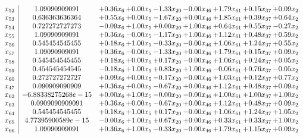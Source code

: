 \documentclass[8pt]{article}
\begin{document}
\[\begin{array}{c| c c@{\hskip 2pt} c@{\hskip 2pt} c@{\hskip 2pt} c@{\hskip 2pt} c@{\hskip 2pt} c@{\hskip 2pt} c@{\hskip 2pt} }
 x_{52}   &  1.09090909091 & +  0.36 x_{6} & +  0.00 x_{5} & -1.33 x_{20} & -0.00 x_{46} & +  1.79 x_{61} & +  0.15 x_{37} & +  0.09 x_{2}\\
 x_{53}   &  0.636363636364 & +  0.55 x_{6} & +  0.00 x_{5} & -1.67 x_{20} & +  0.00 x_{46} & +  1.85 x_{61} & +  0.39 x_{37} & +  0.64 x_{2}\\
 x_{54}   &  0.727272727273 & -0.09 x_{6} & +  1.00 x_{5} & +  0.00 x_{20} & +  1.00 x_{46} & +  0.64 x_{61} & +  0.55 x_{37} & -0.27 x_{2}\\
 x_{55}   &  1.09090909091 & +  0.36 x_{6} & -0.00 x_{5} & -1.17 x_{20} & +  1.00 x_{46} & +  1.12 x_{61} & +  0.48 x_{37} & +  0.59 x_{2}\\
 x_{56}   &  0.545454545455 & +  0.18 x_{6} & +  1.00 x_{5} & -0.33 x_{20} & -0.00 x_{46} & +  1.06 x_{61} & +  1.24 x_{37} & +  0.55 x_{2}\\
 x_{57}   &  1.09090909091 & +  0.36 x_{6} & -0.00 x_{5} & -1.33 x_{20} & +  0.00 x_{46} & +  1.79 x_{61} & +  0.15 x_{37} & +  0.09 x_{2}\\
 x_{58}   &  0.545454545455 & +  0.18 x_{6} & +  0.00 x_{5} & +  0.17 x_{20} & -0.00 x_{46} & +  1.06 x_{61} & +  0.24 x_{37} & +  0.05 x_{2}\\
 x_{59}   &  0.454545454545 & -0.18 x_{6} & +  1.00 x_{5} & +  0.83 x_{20} & +  1.00 x_{46} & -0.06 x_{61} & +  0.76 x_{37} & -0.05 x_{2}\\
 x_{60}   &  0.272727272727 & +  0.09 x_{6} & +  0.00 x_{5} & -0.17 x_{20} & -0.00 x_{46} & +  1.03 x_{61} & +  0.12 x_{37} & +  0.77 x_{2}\\
 x_{47}   &  0.090909090909 & +  0.36 x_{6} & +  0.00 x_{5} & -0.67 x_{20} & +  0.00 x_{46} & +  1.12 x_{61} & +  0.48 x_{37} & +  0.09 x_{2}\\
 x_{62}   &  -6.88338275268e-15 & +  0.00 x_{6} & +  1.00 x_{5} & -0.00 x_{20} & -0.00 x_{46} & +  1.00 x_{61} & +  1.00 x_{37} & +  1.00 x_{2}\\
 x_{63}   &  0.0909090909091 & +  0.36 x_{6} & +  0.00 x_{5} & -0.67 x_{20} & +  0.00 x_{46} & +  1.12 x_{61} & +  0.48 x_{37} & +  0.09 x_{2}\\
 x_{64}   &  0.545454545455 & +  0.18 x_{6} & +  1.00 x_{5} & +  0.17 x_{20} & -0.00 x_{46} & +  1.06 x_{61} & +  1.24 x_{37} & +  1.05 x_{2}\\
 x_{65}   &  4.77395900589e-15 & -0.00 x_{6} & +  1.00 x_{5} & +  0.67 x_{20} & +  0.00 x_{46} & +  0.33 x_{61} & +  0.33 x_{37} & +  1.00 x_{2}\\
 x_{66}   &  1.09090909091 & +  0.36 x_{6} & +  1.00 x_{5} & -0.33 x_{20} & -0.00 x_{46} & +  1.79 x_{61} & +  1.15 x_{37} & +  0.09 x_{2}\\

\end{array}\]
\end{document}
